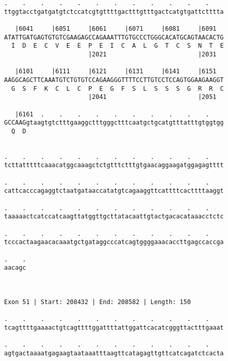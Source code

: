 \documentclass{article}
\begin{document}
\begin{Verbatim}
.    .    .    .    .    .    .    .    .    .    .    .    
ttggtacctgatgatgtctccatcgtgttttgactttgtttgactcatgtgattctttta
                                                            
   |6041     |6051     |6061     |6071     |6081     |6091  
ATATTGATGAGTGTGTCGAAGAGCCAGAAATTTGTGCCCTGGGCACATGCAGTAACACTG
  I  D  E  C  V  E  E  P  E  I  C  A  L  G  T  C  S  N  T  E
                       |2021                         |2031  
  
   |6101     |6111     |6121     |6131     |6141     |6151  
AAGGCAGCTTCAAATGTCTGTGTCCAGAAGGGTTTTCCTTGTCCTCCAGTGGAAGAAGGT
  G  S  F  K  C  L  C  P  E  G  F  S  L  S  S  S  G  R  R  C
                       |2041                         |2051  
  
   |6161  .    .    .    .    .    .    .    .    .    .    
GCCAAGgtaagtgtctttgaaggctttgggctttcaatgctgcatgtttatttgtggtgg
  Q  D                                                      
                                                            
  
.    .    .    .    .    .    .    .    .    .    .    .    
tcttatttttcaaacatggcaaagctctgtttctttgtgaacaggaagatggagagtttt
                                                            
.    .    .    .    .    .    .    .    .    .    .    .    
cattcacccagaggtctaatgataaccatatgtcagaaggttcattttcacttttaaggt
                                                            
.    .    .    .    .    .    .    .    .    .    .    .    
taaaaactcatccatcaagttatggttgcttatacaattgtactgacacataaacctctc
                                                            
.    .    .    .    .    .    .    .    .    .    .    .    
tcccactaagaacacaaatgctgataggcccatcagtggggaaacaccttgagccaccga
                                                            
.    .
aacagc
      
      
 
Exon 51 | Start: 208432 | End: 208582 | Length: 150
 
.    .    .    .    .    .    .    .    .    .    .    .    
tcagttttgaaaactgtcagttttggattttattggattcacatcgggttactttgaaat
                                                            
.    .    .    .    .    .    .    .    .    .    .    .    
agtgactaaaatgagaagtaataaatttaagttcatagagttgttcatcagatctcacta
                                                            

\end{Verbatim}
\end{document}
